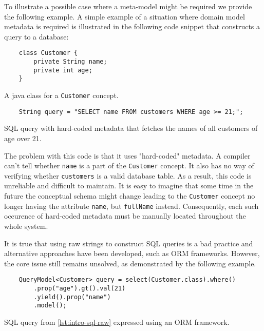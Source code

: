 \n

To illustrate a possible case where a meta-model might be required we provide the following example.
A simple example of a situation where domain model metadata is required is illustrated in the following code snippet that constructs a query to a database:

\begin{listing}[H]
    \begin{verbatim}
    class Customer {
        private String name;
        private int age;
    }
    \end{verbatim}
    \caption{A java class for a \texttt{Customer} concept.}
    \label{lst:intro-customer}
\end{listing}


\begin{listing}[H]
    \begin{verbatim}
    String query = "SELECT name FROM customers WHERE age >= 21;";
    \end{verbatim}
    \caption{SQL query with hard-coded metadata that fetches the names of all customers of age over 21.}
    \label{lst:intro-sql-raw}
\end{listing}

The problem with this code is that it uses "hard-coded" metadata.
A compiler can't tell whether \texttt{name} is a part of the \texttt{Customer} concept.
It also has no way of verifying whether \texttt{customers} is a valid database table.
As a result, this code is unreliable and difficult to maintain.
It is easy to imagine that some time in the future the conceptual schema might change leading to the \texttt{Customer} concept no longer having the attribute \texttt{name}, but \texttt{fullName} instead.
Consequently, each such occurence of hard-coded metadata must be manually located throughout the whole system.

\n

It is true that using raw strings to construct SQL queries is a bad practice and alternative approaches have been developed, such as ORM frameworks.
However, the core issue still remains unsolved, as demonstrated by the following example.

\begin{listing}[H]
    \begin{verbatim}
    QueryModel<Customer> query = select(Customer.class).where()
        .prop("age").gt().val(21)
        .yield().prop("name")
        .model();
    \end{verbatim}
    \caption{SQL query from \ref{lst:intro-sql-raw} expressed using an ORM framework.}
    \label{lst:intro-eql}
\end{listing}

